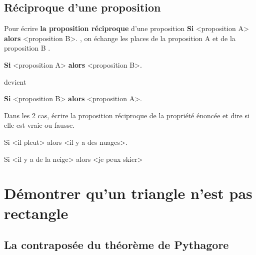 \documentclass[a4paper]{book}
\begin{document}
    \medskip



\newpage


\subsection{Réciproque d'une proposition}

    Pour écrire \textbf{la proposition réciproque} d'une proposition \og \textbf{Si} <proposition A> \textbf{alors} <proposition B>. \fg , on échange les places de la \og proposition A \fg et de la \og proposition B \fg .

    \begin{center}
        \og \textbf{Si} <proposition A> \textbf{alors} <proposition B>. \fg

        devient 

        \og \textbf{Si} <proposition B> \textbf{alors} <proposition A>. \fg
    \end{center}

    Dans les 2 cas, écrire la proposition réciproque de la propriété énoncée et dire si elle est vraie ou fausse.

    \medskip
    
    \begin{minipage}{0.48\linewidth}
        Si <il pleut> alors <il y a des nuages>.

        \vspace{3cm}
    \end{minipage}
    \vline
    \hfill
    \begin{minipage}{0.48\linewidth}
        Si <il y a de la neige> alors <je peux skier>

        \vspace{3cm}
    \end{minipage}

    \medskip



\section{Démontrer qu'un triangle n'est pas rectangle}
\subsection{La contraposée du théorème de Pythagore}
\end{document}
